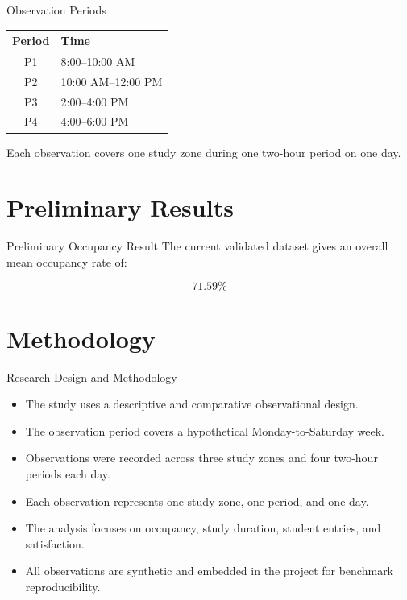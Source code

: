 \documentclass[aspectratio=169,11pt]{beamer}
\begin{document}
\begin{frame}{Observation Periods}
    \begin{table}
        \centering
        \small
        \begin{tabular}{cl}
            \toprule
            \textbf{Period} & \textbf{Time} \\
            \midrule
            P1 & 8:00--10:00 AM \\
            P2 & 10:00 AM--12:00 PM \\
            P3 & 2:00--4:00 PM \\
            P4 & 4:00--6:00 PM \\
            \bottomrule
        \end{tabular}
    \end{table}

    \vspace{0.3cm}

    Each observation covers one study zone during one two-hour period
    on one day.
\end{frame}

\section{Preliminary Results}

\begin{frame}{Preliminary Occupancy Result}
    The current validated dataset gives an overall mean occupancy rate of:

    \[
    \boxed{71.59\%}
    \]
\end{frame}

\section{Methodology}

\begin{frame}{Research Design and Methodology}
	\begin{itemize}
		\item The study uses a descriptive and comparative observational design.
		
		\item The observation period covers a hypothetical Monday-to-Saturday week.
		
		\item Observations were recorded across three study zones and four two-hour periods each day.
		
		\item Each observation represents one study zone, one period, and one day.
		
		\item The analysis focuses on occupancy, study duration, student entries, and satisfaction.
		
		\item All observations are synthetic and embedded in the project for benchmark reproducibility.
	\end{itemize}
\end{frame}
\end{document}
